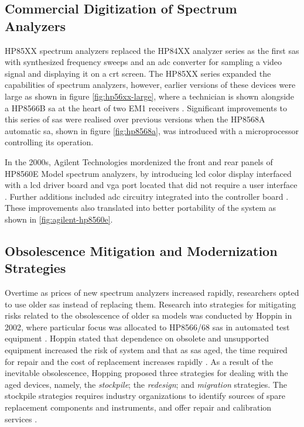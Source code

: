 \documentclass[class=report,11pt,crop=false]{standalone}
\begin{document}
\subsection{Commercial Digitization of Spectrum Analyzers}

HP85XX spectrum analyzers replaced the HP84XX analyzer series as the first \acrshort{sa}s with synthesized frequency sweeps and an \acrshort{adc} converter for sampling a video signal and displaying it on a \acrshort{crt} screen. The HP85XX series expanded the capabilities of spectrum analyzers, however, earlier versions of these devices were large as shown in figure \ref{fig:hp56xx-large}, where a technician is shown alongside a HP8566B \acrshort{sa} at the heart of two EM1 receivers \cite{hp8566}. Significant improvements to this series of \acrshort{sa}s were realised over previous versions when the HP8568A automatic \acrshort{sa}, shown in figure \ref{fig:hp8568a}, was introduced with a microprocessor controlling its operation. 

In the 2000s, Agilent Technologies mordenized the front and rear panels of HP8560E Model spectrum analyzers,  by introducing \acrshort{lcd} color display interfaced with a \acrshort{lcd} driver board and \acrshort{vga} port located that did not require a user interface \cite{hp8560ec}. Further additions included \acrshort{adc} circuitry integrated into the controller board \cite{hp8560ec}. These improvements also translated into better portability of the system as shown in \ref{fig:agilent-hp8560e}. 

\subsection{Obsolescence Mitigation and Modernization Strategies}

Overtime as prices of new spectrum analyzers increased rapidly, researchers opted to use older \acrshort{sa}s instead of replacing them. Research into strategies for mitigating risks related to the obsolescence of older \acrshort{sa} models was conducted by Hoppin in 2002, where particular focus was allocated to HP8566/68 \acrshort{sa}s in automated test equipment \cite{hoppin2002}. Hoppin stated that dependence on obsolete and unsupported equipment increased the risk of system and that as \acrshort{sa}s aged, the time required for repair and the cost of replacement increases rapidly \cite{hoppin2002}. As a result of the inevitable obsolescence, Hopping proposed three strategies for dealing with the aged devices, namely, the \textit{stockpile}; the \textit{redesign}; and \textit{migration} strategies. The stockpile strategies requires industry organizations to identify sources of spare replacement components and instruments, and offer repair and calibration services \cite{hoppin2002}. 
\end{document}
